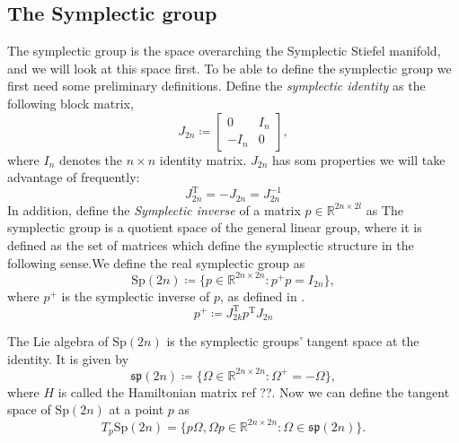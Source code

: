 \subsection{The Symplectic group}
The symplectic group is the space overarching the Symplectic Stiefel manifold, and we will look at this space first. To be able to define the symplectic group we first need some preliminary definitions. Define the \textit{symplectic identity} as the following block matrix,
\begin{equation*}
    J_{2n}\coloneqq\begin{bmatrix}
        0 & I_{n} \\
        -I_{n} & 0
    \end{bmatrix},
\end{equation*}
where $I_{n}$ denotes the $n\times n$ identity matrix. $J_{2n}$ has som properties we will take advantage of frequently:
\begin{equation}\label{eq:J_2n_properties}
    J_{2n} ^{\mathrm{T}}=-J_{2n}=J_{2n}^{-1}
\end{equation}
In addition, define the \textit{Symplectic inverse} of a matrix $p\in \mathbb{R}^{2n\times2l}$ as
The symplectic group is a quotient space of the general linear group, where it is defined as the set of matrices which define the symplectic structure in the following sense.We define the real symplectic group as
\begin{equation}\label{eq:sp_def}
    \mathrm{Sp}(2n)\coloneqq \{p\in \mathbb{R}^{2n\times2n}:p^{+}p=I_{2n}\},
\end{equation}
where $p^{+}$ is the symplectic inverse of $p$, as defined in \cite{symplectic_inverse}. 
\begin{equation}\label{eq:symplectic_inverse}
    p^{+}\coloneqq J_{2k}^{\mathrm{T}}p ^{\mathrm{T}}J_{2n}
\end{equation}

The Lie algebra of $\mathrm{Sp}(2n)$ is the symplectic groups' tangent space at the identity. It is given by 
\begin{equation}\label{eq:sp_Lie_algebra}
    \mathfrak{sp}(2n)\coloneqq \{\Omega\in \mathbb{R}^{2n\times2n}:\Omega^{+}=-\Omega\},
\end{equation}
where $H$ is called the Hamiltonian matrix ref ??. %
Now we can define the tangent space of $\mathrm{Sp}(2n)$ at a point $p$ as
\begin{equation}\label{eq:sp_tangent_space}
    T_{p}\mathrm{Sp}(2n)=\{p\Omega,\Omega p\in \mathbb{R}^{2n\times2n}:\Omega\in\mathfrak{sp}(2n)\}.
\end{equation}

